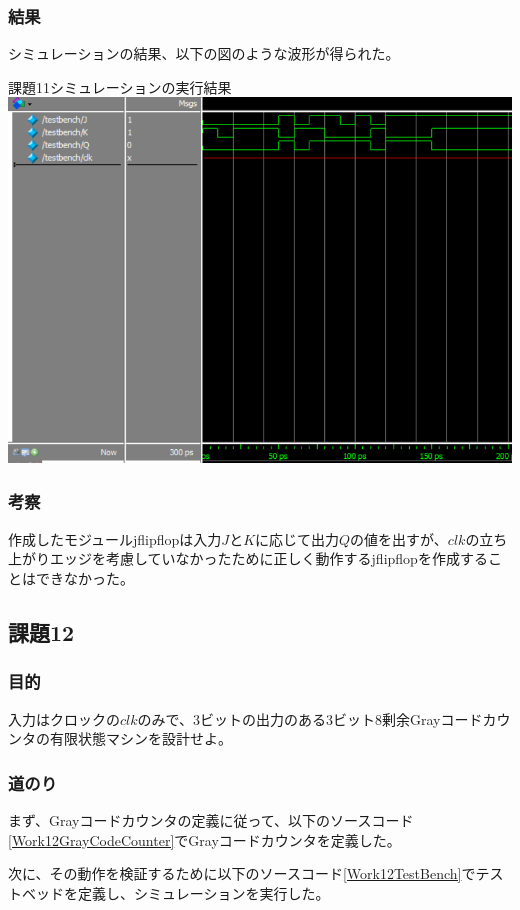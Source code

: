 \documentclass[a4paper]{jarticle}
\begin{document}
\subsubsection{結果}
シミュレーションの結果、以下の図のような波形が得られた。
\begin{center}
	課題11シミュレーションの実行結果
	\includegraphics[width=15cm]{11-m.PNG}
\end{center}
\subsubsection{考察}
作成したモジュールjflipflopは入力$J$と$K$に応じて出力$Q$の値を出すが、$clk$の立ち上がりエッジを考慮していなかったために正しく動作するjflipflopを作成することはできなかった。
\subsection{課題12}
\subsubsection{目的}
入力はクロックの$clk$のみで、3ビットの出力のある3ビット8剰余Grayコードカウンタの有限状態マシンを設計せよ。
\subsubsection{道のり}
まず、Grayコードカウンタの定義に従って、以下のソースコード\ref{Work12GrayCodeCounter}でGrayコードカウンタを定義した。

次に、その動作を検証するために以下のソースコード\ref{Work12TestBench}でテストベッドを定義し、シミュレーションを実行した。

\end{document}
